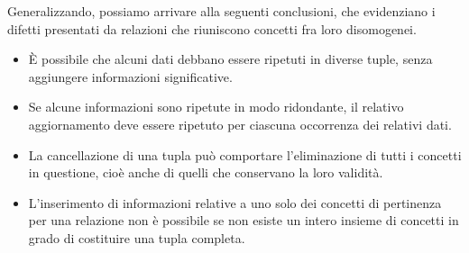 \documentclass[12pt]{report}
\begin{document}
	Generalizzando, possiamo arrivare alla seguenti conclusioni, che evidenziano i difetti presentati da relazioni che riuniscono concetti fra loro disomogenei.
	\begin{itemize}
		\item È possibile che alcuni dati debbano essere ripetuti in diverse tuple, senza aggiungere informazioni significative.
		\item Se alcune informazioni sono ripetute in modo ridondante, il relativo aggiornamento deve essere ripetuto per ciascuna occorrenza dei relativi dati.
		\item La cancellazione di una tupla può comportare l'eliminazione di tutti i concetti in questione, cioè anche di quelli che conservano la loro validità.
		\item L'inserimento di informazioni relative a uno solo dei concetti di pertinenza per una relazione non è possibile se non esiste un intero insieme di concetti in grado di costituire una tupla completa.
	\end{itemize}
\end{document}
